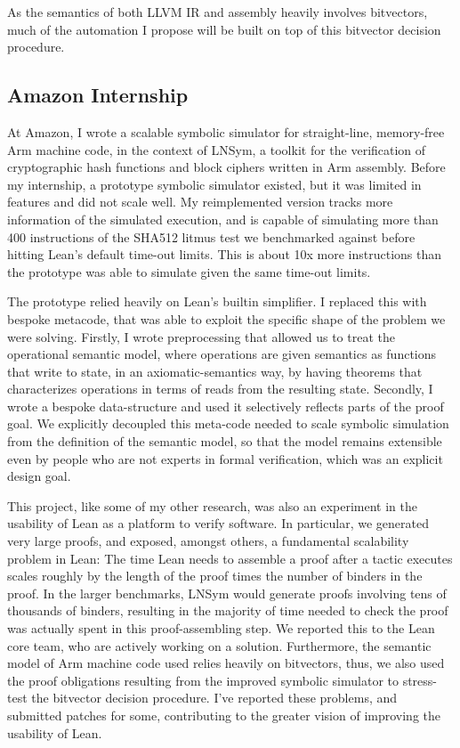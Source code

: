 \documentclass[a4paper]{scrartcl}
\begin{document}
As the semantics of both LLVM IR and assembly heavily involves bitvectors, much of 
the automation I propose will be built on top of this bitvector decision procedure.

\subsection{Amazon Internship}\label{amazon-internship}

At Amazon, I wrote a scalable symbolic simulator for straight-line, memory-free Arm machine code, in the context of LNSym, 
a toolkit for the verification of cryptographic hash functions and block ciphers written in Arm assembly.
Before my internship, a prototype symbolic simulator existed, but it was limited in features and did not scale well.
My reimplemented version tracks more information of the simulated execution, 
and is capable of simulating more than 400 instructions of the SHA512 litmus test we benchmarked against before hitting Lean's default time-out limits.
This is about 10x more instructions than the prototype was able to simulate given the same time-out limits.

The prototype relied heavily on Lean's builtin simplifier. 
I replaced this with bespoke metacode, that was able to exploit the specific shape of the problem we were solving.
Firstly, I wrote preprocessing that allowed us to treat the operational semantic model, where operations are given semantics as functions that write to state, 
in an axiomatic-semantics way, by having theorems that characterizes operations in terms of reads from the resulting state.
Secondly, I wrote a bespoke data-structure and used it selectively reflects parts of the proof goal.
We explicitly decoupled this meta-code needed to scale symbolic simulation from the definition of the semantic model,
so that the model remains extensible even by people who are not experts in formal verification, which was an explicit design goal.

This project, like some of my other research, was also an experiment in the usability of Lean as a platform to verify software.
In particular, we generated very large proofs, and exposed, amongst others, a fundamental scalability problem in Lean:
The time Lean needs to assemble a proof after a tactic executes scales roughly by the length of the proof times the number of binders in the proof.
In the larger benchmarks, LNSym would generate proofs involving tens of thousands of binders,
resulting in the majority of time needed to check the proof was actually spent in this proof-assembling step.
We reported this to the Lean core team, who are actively working on a solution.
Furthermore, the semantic model of Arm machine code used relies heavily on bitvectors, thus, we also used the proof obligations resulting from the improved symbolic simulator to stress-test the bitvector decision procedure. I've reported these problems, and submitted patches for some, contributing to the greater vision of improving the usability of Lean.
\end{document}
